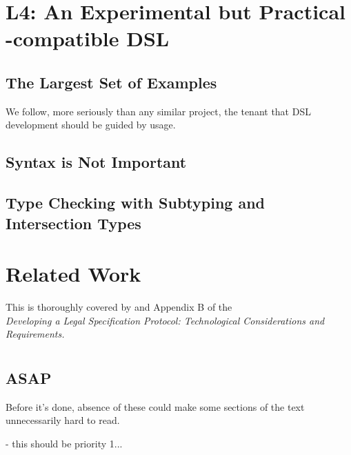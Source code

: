 \documentclass[12pt]{article}
\newcommand{\termz}[2]{\EM{\textsf{\hyperref[#1]{#2}}}\xspace}
\newcommand{\lsm}{\texorpdfstring{\termz{lsm}{CSM}}{CSM}}
\begin{document}
\section{L4: An Experimental but Practical \lsm-compatible DSL}
\subsection{The Largest Set of Examples}
We follow, more seriously than any similar project, the tenant that DSL development should be guided by usage.

\extlink{}{}

\subsection{Syntax is Not Important}

\subsection{Type Checking with Subtyping and Intersection Types} \label{typechecking}


\section{Related Work}

This is thoroughly covered by  and Appendix B of the \\  {\it Developing a Legal Specification Protocol: Technological Considerations and Requirements.}


\section{\texorpdfstring{}{Dustin's todo}}
\subsection{ASAP}
Before it's done, absence of these could make some sections of the text unnecessarily hard to read.
\begin{LPPI}
\item {} - this should be priority 1...
\item {}
\end{LPPI}
\end{document}
